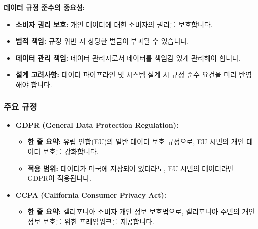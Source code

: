 \documentclass[11pt,a4paper]{article}
\theoremstyle{definition}
\begin{document}
\begin{summarybox}
\textbf{데이터 규정 준수의 중요성:}
\begin{itemize}
    \item \textbf{소비자 권리 보호:} 개인 데이터에 대한 소비자의 권리를 보호합니다.
    \item \textbf{법적 책임:} 규정 위반 시 상당한 벌금이 부과될 수 있습니다.
    \item \textbf{데이터 관리 책임:} 데이터 관리자로서 데이터를 책임감 있게 관리해야 합니다.
    \item \textbf{설계 고려사항:} 데이터 파이프라인 및 시스템 설계 시 규정 준수 요건을 미리 반영해야 합니다.
\end{itemize}
\end{summarybox}

\subsubsection{주요 규정}
\begin{itemize}
    \item \textbf{GDPR (General Data Protection Regulation):}
    \begin{itemize}
        \item \textbf{한 줄 요약:} 유럽 연합(EU)의 일반 데이터 보호 규정으로, EU 시민의 개인 데이터 보호를 강화합니다.
        \item \textbf{적용 범위:} 데이터가 미국에 저장되어 있더라도, EU 시민의 데이터라면 GDPR이 적용됩니다.
    \end{itemize}
    \item \textbf{CCPA (California Consumer Privacy Act):}
    \begin{itemize}
        \item \textbf{한 줄 요약:} 캘리포니아 소비자 개인 정보 보호법으로, 캘리포니아 주민의 개인 정보 보호를 위한 프레임워크를 제공합니다.
    \end{itemize}
\end{itemize}
\end{document}

